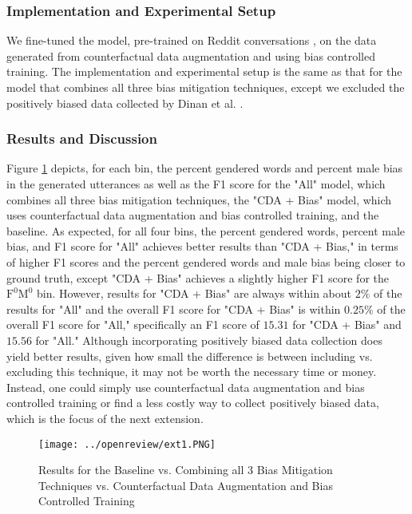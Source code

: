 \subsubsection{Implementation and Experimental Setup}
We fine-tuned the model, pre-trained on Reddit conversations \supercite{redditmodel}, on the data generated from counterfactual data augmentation and using bias controlled training. The implementation and experimental setup is the same as that for the model that combines all three bias mitigation techniques, except we excluded the positively biased data collected by Dinan et al. \supercite{dinan2020}.

\subsubsection{Results and Discussion}
Figure \ref{fig:ext1Results} depicts, for each bin, the percent gendered words and percent male bias in the generated utterances as well as the F1 score for the "All" model, which combines all three bias mitigation techniques, the "CDA + Bias" model, which uses counterfactual data augmentation and bias controlled training, and the baseline. As expected, for all four bins, the percent gendered words, percent male bias, and F1 score for "All" achieves better results than "CDA + Bias," in terms of higher F1 scores and the percent gendered words and male bias being closer to ground truth, except "CDA + Bias" achieves a slightly higher F1 score for the $\mathrm{F}^0\mathrm{M}^0$ bin. However, results for "CDA + Bias" are always within about $2\%$ of the results for "All" and the overall F1 score for "CDA + Bias" is within $0.25\%$ of the overall F1 score for "All," specifically an F1 score of $15.31$ for "CDA + Bias" and $15.56$ for "All." Although incorporating positively biased data collection does yield better results, given how small the difference is between including vs. excluding this technique, it may not be worth the necessary time or money. Instead, one could simply use counterfactual data augmentation and bias controlled training or find a less costly way to collect positively biased data, which is the focus of the next extension.

\begin{figure}[h!]
    \centering
    \texttt{[image: ../openreview/ext1.PNG]}
    \caption{Results for the Baseline vs. Combining all 3 Bias Mitigation Techniques vs. Counterfactual Data Augmentation and Bias Controlled Training}
    \label{fig:ext1Results}
\end{figure}

